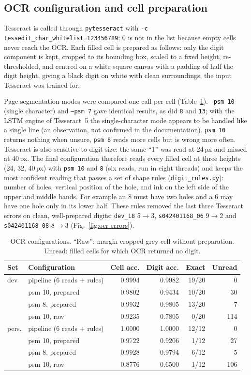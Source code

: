 \documentclass[conference]{IEEEtran}
\begin{document}
\subsection{OCR configuration and cell preparation}
Tesseract is called through \texttt{pytesseract} with \texttt{-c tessedit\_char\_whitelist=123456789}; 0 is not in the list because empty cells never reach the OCR. Each filled cell is prepared as follows: only the digit component is kept, cropped to its bounding box, scaled to a fixed height, re-thresholded, and centred on a white square canvas with a padding of half the digit height, giving a black digit on white with clean surroundings, the input Tesseract was trained for.

Page-segmentation modes were compared one call per cell (Table~\ref{tab:ocr}). \texttt{--psm 10} (single character) and \texttt{--psm 7} gave identical results, as did \texttt{8} and \texttt{13}; with the LSTM engine of Tesseract~5 the single-character mode appears to be handled like a single line (an observation, not confirmed in the documentation). \texttt{psm 10} returns nothing when unsure, \texttt{psm 8} reads more cells but is wrong more often. Tesseract is also sensitive to digit size: the same ``1'' was read at 24\,px and missed at 40\,px. The final configuration therefore reads every filled cell at three heights (24, 32, 40\,px) with \texttt{psm 10} and \texttt{8} (six reads, run in eight threads) and keeps the most confident reading that passes a set of shape rules (\texttt{digit\_rules.py}): number of holes, vertical position of the hole, and ink on the left side of the upper and middle bands. For example an 8 must have two holes and a 6 may have one hole only in its lower half. These rules removed the last three Tesseract errors on clean, well-prepared digits: \texttt{dev\_18} 5$\to$3, \texttt{s042401168\_06} 9$\to$2 and \texttt{s042401168\_08} 8$\to$3 (Fig.~\ref{fig:ocr-errors}).

\begin{table}[t]
\centering\footnotesize
\caption{OCR configurations. ``Raw'': margin-cropped grey cell without preparation. Unread: filled cells for which OCR returned no digit.}
\label{tab:ocr}
\setlength{\tabcolsep}{4pt}
\begin{tabular}{@{}l l r r r r@{}}
\toprule
Set & Configuration & Cell acc. & Digit acc. & Exact & Unread\\
\midrule
dev & pipeline (6 reads + rules) & 0.9994 & 0.9982 & 19/20 & 0\\
 & psm 10, prepared & 0.9802 & 0.9434 & 10/20 & 30\\
 & psm 8, prepared & 0.9932 & 0.9805 & 13/20 & 7\\
 & psm 10, raw & 0.9235 & 0.7805 & 0/20 & 114\\
\midrule
pers. & pipeline (6 reads + rules) & 1.0000 & 1.0000 & 12/12 & 0\\
 & psm 10, prepared & 0.9722 & 0.9206 & 1/12 & 27\\
 & psm 8, prepared & 0.9928 & 0.9794 & 6/12 & 5\\
 & psm 10, raw & 0.8776 & 0.6500 & 1/12 & 106\\
\bottomrule
\end{tabular}
\end{table}
\end{document}
